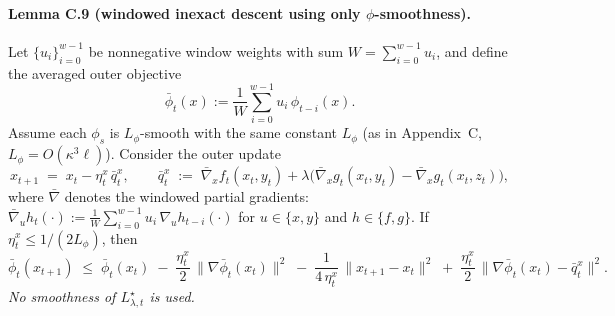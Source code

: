 \documentclass{uai2026} %
\begin{document}
\paragraph{Lemma C.9 (windowed inexact descent using only $\phi$-smoothness).}
Let $\{u_i\}_{i=0}^{w-1}$ be nonnegative window weights with sum $W=\sum_{i=0}^{w-1}u_i$, and define the
averaged outer objective
\[
\bar\phi_t(x):=\frac{1}{W}\sum_{i=0}^{w-1}u_i\,\phi_{t-i}(x).
\]
Assume each $\phi_s$ is $L_\phi$-smooth with the same constant $L_\phi$ (as in Appendix~C, $L_\phi=O(\kappa^3\ell)$).
Consider the outer update
\[
x_{t+1}\;=\;x_t-\eta^x_t\,\bar q^x_t,\qquad
\bar q^x_t\;:=\;\bar\nabla_x f_t(x_t,y_t)
+\lambda\big(\bar\nabla_x g_t(x_t,y_t)-\bar\nabla_x g_t(x_t,z_t)\big),
\]
where $\bar\nabla$ denotes the windowed partial gradients:
$\displaystyle \bar\nabla_u h_t(\cdot):=\frac{1}{W}\sum_{i=0}^{w-1}u_i\,\nabla_u h_{t-i}(\cdot)$ for $u\in\{x,y\}$ and
$h\in\{f,g\}$. If $\eta^x_t\le 1/(2L_\phi)$, then
\begin{equation}
\label{eq:win-C9}
\bar\phi_t(x_{t+1})
\;\le\;
\bar\phi_t(x_t)
\;-\;\frac{\eta^x_t}{2}\,\big\|\nabla\bar\phi_t(x_t)\big\|^2
\;-\;\frac{1}{4\,\eta^x_t}\,\|x_{t+1}-x_t\|^2
\;+\;\frac{\eta^x_t}{2}\,\big\|\nabla\bar\phi_t(x_t)-\bar q^x_t\big\|^2.
\end{equation}
\emph{No smoothness of $L^\star_{\lambda,t}$ is used.}
\end{document}
